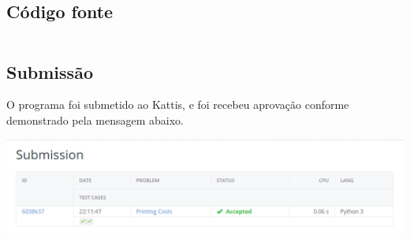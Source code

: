 \documentclass[11pt,a4paper]{scrreprt}
\begin{document}
\subsection{Código fonte}

\inputminted[linenos]{python}{src/printingcosts.py}

\subsection{Submissão}
O programa foi submetido ao Kattis, e foi recebeu aprovação conforme demonstrado pela mensagem abaixo.

\includegraphics[scale=0.47]{img/pritingCosts.png}
\end{document}
